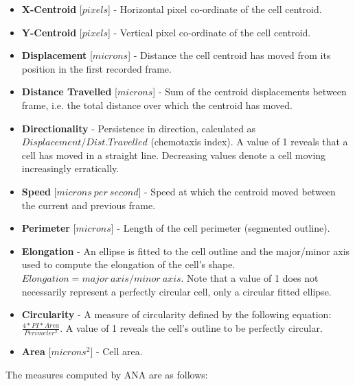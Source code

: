 \documentclass[a4paper,12pt]{article}
\begin{document}
\begin{itemize}

	\item \textbf{X-Centroid} [$pixels$] - Horizontal pixel co-ordinate of the cell centroid.

	\item \textbf{Y-Centroid} [$pixels$] - Vertical pixel co-ordinate of the cell centroid.
	
	\item \textbf{Displacement} [$microns$] - Distance the cell centroid has moved from its position in the first recorded frame. 
	
	\item \textbf{Distance Travelled} [$microns$] - Sum of the centroid displacements between frame, i.e. the total distance 
	over which the centroid has moved.
	
	\item \textbf{Directionality} - Persistence in direction, calculated as $Displacement / Dist. Travelled$ (chemotaxis index). A value of 1 reveals that
	a cell has moved in a straight line.  Decreasing values denote a cell moving increasingly erratically.
	
	\item \textbf{Speed} [$microns~per~second$] - Speed at which the centroid moved between the current and previous frame.
	
	 \item \textbf{Perimeter} [$microns$] - Length of the cell perimeter (segmented outline).
	  
	 \item \textbf{Elongation} - An ellipse is fitted to the cell outline and the major/minor axis used to compute the elongation of 
	 the cell's shape. $Elongation = major~axis / minor~axis$. Note that a value of 1 does not necessarily represent
	 a perfectly circular cell, only a circular fitted ellipse.
	 
	 \item \textbf{Circularity}  - A measure of circularity defined by the following equation:
	$\frac{4*PI*Area}{Perimeter^{2}}$. A value of 1 reveals the cell's outline to be perfectly circular.
	 
	 \item \textbf{Area} [$microns^{2}$] - Cell area.
	 
\end{itemize}

The measures computed by ANA are as follows:
\end{document}
